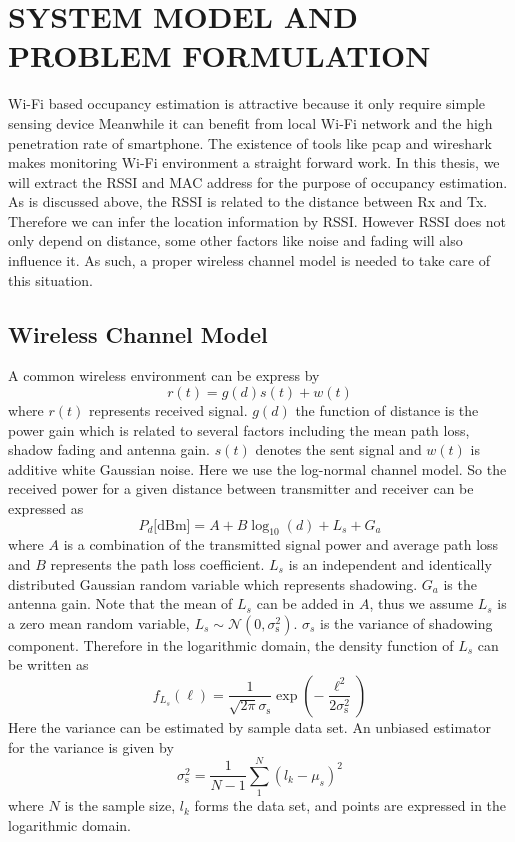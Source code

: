 \chapter{SYSTEM MODEL AND PROBLEM FORMULATION}
Wi-Fi based occupancy estimation is attractive because it only require simple sensing device Meanwhile it can benefit from local Wi-Fi network and the high penetration rate of smartphone. The existence of tools like pcap and wireshark makes monitoring Wi-Fi environment a straight forward work. In this thesis, we will extract the RSSI and MAC address for the purpose of occupancy estimation. As is discussed above, the RSSI is related to the distance between Rx and Tx. Therefore we can infer the location information by RSSI. However RSSI does not only depend on distance, some other factors like noise and fading will also influence it. As such, a proper wireless channel model is needed to take care of this situation.
\section{Wireless Channel Model}
A common wireless environment can be express by
\begin{equation*}
r (t) = g (d) s (t) + w (t)
\end{equation*}
where $r (t)$ represents received signal. $g (d)$ the function of distance is the power gain which is related to several factors including the mean path loss, shadow fading and antenna gain. $s (t)$ denotes the sent signal and $w (t)$ is additive white Gaussian noise.
Here we use the log-normal channel model. So the received power for a given distance between transmitter and receiver can be expressed as
\begin{equation} \label{channel}
P_{d} \text{[dBm]}
= A + B \log_{10}(d) + L_{s} + G_{a} 
\end{equation}
where $A$ is a combination of the transmitted signal power and average path loss
and $B$ represents the path loss coefficient.
$L_{s}$ is an independent and identically distributed Gaussian random variable which represents shadowing.
$G_{a}$ is the antenna gain. Note that the mean of $L_{s}$ can be added in $A$, thus we assume $L_{s}$ is a zero mean random variable, $L_{s}\sim\mathcal{N}(0,\sigma_{\mathrm{s}}^2)$. $\sigma_{s}$ is the variance of shadowing component. Therefore in the logarithmic domain, the density function of $L_{s}$ can be written as
\begin{equation*}
f_{L_{s}} (\ell)
= \frac{1}{\sqrt{2 \pi} \sigma_{\mathrm{s}}} 
\exp \left( - \frac{\ell^2}{2 \sigma_{\mathrm{s}}^2} \right) 
\end{equation*}
Here the variance can be estimated by sample data set. An unbiased estimator for the variance is given by~\cite{zwillinger1995crc}
\begin{equation*}
\sigma_{\mathrm{s}}^2 = \frac{1}{N-1} \sum_{1}^{N} (l_{k}-\mu_{s})^2
\end{equation*} 
where $N$ is the sample size, $l_{k}$ forms the data set, and points are expressed in the logarithmic domain.

